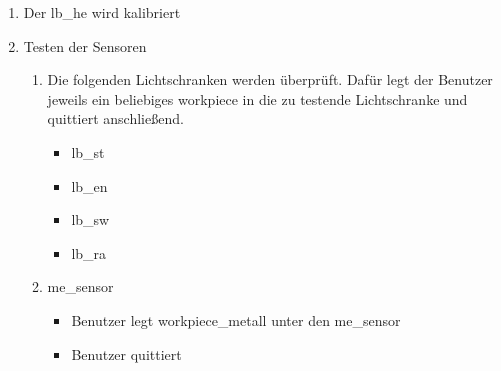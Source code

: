 \begin{enumerate}
    \item Der \gls{lb_he} wird kalibriert
    \item Testen der Sensoren
    \begin{enumerate}
        \item Die folgenden Lichtschranken werden überprüft.
        Dafür legt der Benutzer jeweils ein beliebiges \gls{workpiece} in die zu testende Lichtschranke und
        quittiert anschließend.
        \begin{itemize}
            \item \gls{lb_st}
            \item \gls{lb_en}
            \item \gls{lb_sw}
            \item \gls{lb_ra}
        \end{itemize}

        \item \Gls{me_sensor}
        \begin{itemize}
            \item Benutzer legt \gls{workpiece_metall} unter den \gls{me_sensor}
            \item Benutzer quittiert
        \end{itemize}
    \end{enumerate}


\end{enumerate}
